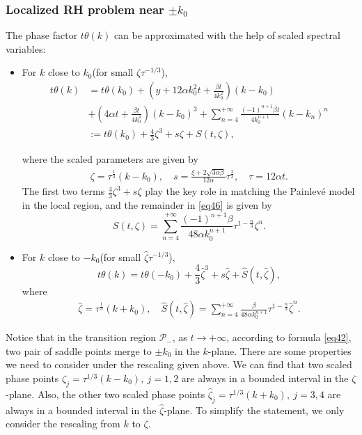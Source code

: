 \documentclass[11pt]{article}
\numberwithin{equation}{section}
\begin{document}
\subsubsection{\texorpdfstring{Localized RH problem near $\pm k_0$}{Localized RH problem near ±k₀}}
The phase factor $t\theta(k)$ can be approximated with the help of scaled spectral variables:
\begin{itemize}
    \item For $k$ close to $k_0$(for small $ \zeta \tau^{-1/3}$),
    \begin{equation}\label{eq46}
        \begin{aligned}
    t\theta(k)&=t\theta(k_0)+\left(y+12\alpha k_0^2t+\frac{\beta t}{4k_0^2}\right)(k-k_0)\\
    &+\left(4\alpha t+\frac{\beta t}{4k_0^4}\right)(k-k_0)^3+\sum_{n=4}^{+\infty}\frac{(-1)^{n+1}\beta t}{4k_0^{n+1}}(k-k_n)^n\\
    &:=t\theta(k_0)+\frac{4}{3}\zeta^3+s\zeta+S(t,\zeta),
    \end{aligned}
    \end{equation}

where the scaled parameters are given by
\begin{align}\label{eq49}
    \zeta=\tau ^{\frac{1}{3}}(k-k_0),\quad s=\frac{\xi+2\sqrt{3\alpha \beta}}{12\alpha}\tau ^{\frac{2}{3}},\quad \tau=12\alpha t.
\end{align}
 The first two terms  $ \frac{4}{3} \zeta^3 + s \zeta $   play  the key  role in
matching  the   Painlev\'e  model  in the local region, and   the  remainder in \eqref{eq46} is given by
\begin{equation}
    S(t,\zeta)=\sum_{n=4}^{+\infty}\frac{(-1)^{n+1}\beta}{48\alpha k_0^{n+1}}\tau^{1-\frac{n}{3}}\zeta^n.
\end{equation}
\item For $k$ close to $-k_0$(for small $\hat \zeta\tau^{-1/3}$),
\begin{equation}
    t\theta(k)=t\theta(-k_0)+\frac{4}{3}\hat{\zeta}^3+ s\hat \zeta+\hat S(t,\hat{\zeta}),
\end{equation}
where
\begin{align}\label{eq50}
    \hat \zeta=\tau ^{\frac{1}{3}}(k+k_0),\quad \hat S(t,\hat{\zeta})=\sum_{n=4}^{+\infty}\frac{\beta}{48\alpha k_0^{n+1}}\tau^{1-\frac{n}{3}}\hat{\zeta}^n.
\end{align}
\end{itemize}
Notice that in the transition region $\mathcal{P}_{-}$, as $t \to + \infty$, according to  formula \eqref{eq42}, two  pair of saddle points merge to $\pm k_0$ in the $k$-plane. There are some properties we need to consider under the rescaling given above. We can find that  two scaled phase points $\zeta_j= \tau^{1/3} ( k-k_0  ), \ j=1,2$ are always in a bounded interval in the $\zeta$-plane. Also, the other two scaled phase points $\hat \zeta_j= \tau^{1/3} ( k+k_0  ), \ j=3,4$ are always in a bounded interval in the $\hat \zeta$-plane.  To simplify the statement, we only consider the rescaling from $k$ to $\zeta$.
\end{document}
